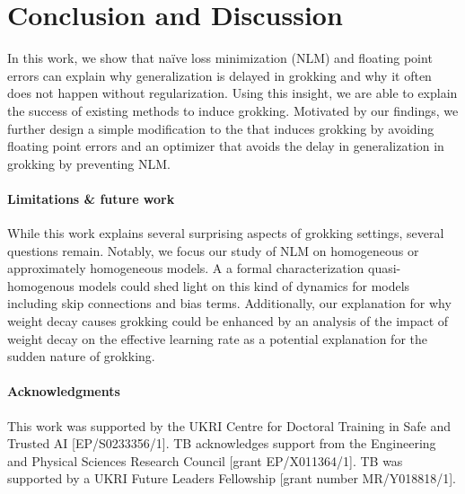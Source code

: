 \vspace{-2mm}
\section{Conclusion and Discussion}
\vspace{-2mm}
In this work, we show that naïve loss minimization (NLM) and floating point errors can explain why generalization is delayed in grokking and why it often does not happen without regularization. Using this insight, we are able to explain the success of existing methods to induce grokking. Motivated by our findings, we further design a simple modification to the \softmax that induces grokking by avoiding floating point errors and an optimizer that avoids the delay in generalization in grokking by preventing NLM. 

\paragraph{Limitations \& future work} While this work explains several surprising aspects of grokking settings, several questions remain. Notably, we focus our study of NLM on homogeneous or approximately homogeneous models. A a formal characterization  quasi-homogenous models could shed light on this kind of dynamics for models including skip connections and bias terms. Additionally, our explanation for why weight decay causes grokking could be enhanced by an analysis of the impact of weight decay on the effective learning rate as a potential explanation for the sudden nature of grokking.

\footnotesize
\paragraph{Acknowledgments}
This work was supported by the UKRI Centre for Doctoral Training in Safe and Trusted AI
[EP/S0233356/1]. TB acknowledges support from the Engineering and Physical Sciences Research Council [grant EP/X011364/1].
TB was supported by a UKRI Future Leaders Fellowship [grant number MR/Y018818/1]. 